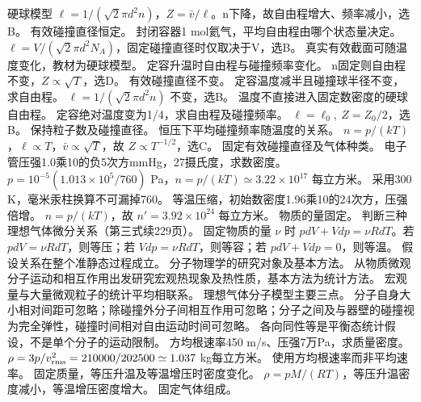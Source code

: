 \workings 硬球模型 $\ell=1/(\sqrt2\pi d^2n)$，$Z=\bar v/\ell$。n下降，故自由程增大、频率减小，选B。
\crosscheck 有效碰撞直径恒定。
\problemtext 封闭容器1 mol氦气，平均自由程由哪个状态量决定。
\workings $\ell=V/(\sqrt2\pi d^2N_A)$，固定碰撞直径时仅取决于V，选B。
\crosscheck 真实有效截面可随温度变化，教材为硬球模型。
\problemtext 定容升温时自由程与碰撞频率变化。
\workings n固定则自由程不变，$Z\propto\sqrt T$，选D。
\crosscheck 有效碰撞直径不变。
\problemtext 定容温度减半且碰撞球半径不变，求自由程。
\workings $\ell=1/(\sqrt2\pi d^2n)$ 不变，选B。
\crosscheck 温度不直接进入固定数密度的硬球自由程。
\problemtext 定容绝对温度变为1/4，求自由程及碰撞频率。
\workings $\ell=\ell_0,\ Z=Z_0/2$，选B。
\crosscheck 保持粒子数及碰撞直径。
\problemtext 恒压下平均碰撞频率随温度的关系。
\workings $n=p/(kT)$，$\ell\propto T$，$\bar v\propto\sqrt T$，故 $Z\propto T^{-1/2}$，选C。
\crosscheck 固定有效碰撞直径及气体种类。
\problemtext 电子管压强1.0乘10的负5次方mmHg，27摄氏度，求数密度。
\workings $p=10^{-5}(1.013\times10^5/760)$ Pa，$n=p/(kT)\simeq3.22\times10^{17}$ 每立方米。
\crosscheck 采用300 K，毫米汞柱换算不可漏掉760。
\problemtext 等温压缩，初始数密度1.96乘10的24次方，压强倍增。
\workings $n=p/(kT)$，故 $n'=3.92\times10^{24}$ 每立方米。
\crosscheck 物质的量固定。
\problemtext 判断三种理想气体微分关系（第三式续229页）。
\workings 固定物质的量 $\nu$ 时 $pdV+Vdp=\nu RdT$。若 $pdV=\nu RdT$，则等压；若 $Vdp=\nu RdT$，则等容；若 $pdV+Vdp=0$，则等温。
\crosscheck 假设关系在整个准静态过程成立。
\problemtext 分子物理学的研究对象及基本方法。
\workings 从物质微观分子运动和相互作用出发研究宏观热现象及热性质，基本方法为统计方法。
\crosscheck 宏观量与大量微观粒子的统计平均相联系。
\problemtext 理想气体分子模型主要三点。
\workings 分子自身大小相对间距可忽略；除碰撞外分子间相互作用可忽略；分子之间及与器壁的碰撞视为完全弹性，碰撞时间相对自由运动时间可忽略。
\crosscheck 各向同性等是平衡态统计假设，不是单个分子的运动限制。
\problemtext 方均根速率450 m/s、压强7万Pa，求质量密度。
\workings $\rho=3p/v_{\rm rms}^2=210000/202500\simeq1.037$ kg每立方米。
\crosscheck 使用方均根速率而非平均速率。
\problemtext 固定质量，等压升温及等温增压时密度变化。
\workings $\rho=pM/(RT)$，等压升温密度减小，等温增压密度增大。
\crosscheck 固定气体组成。
